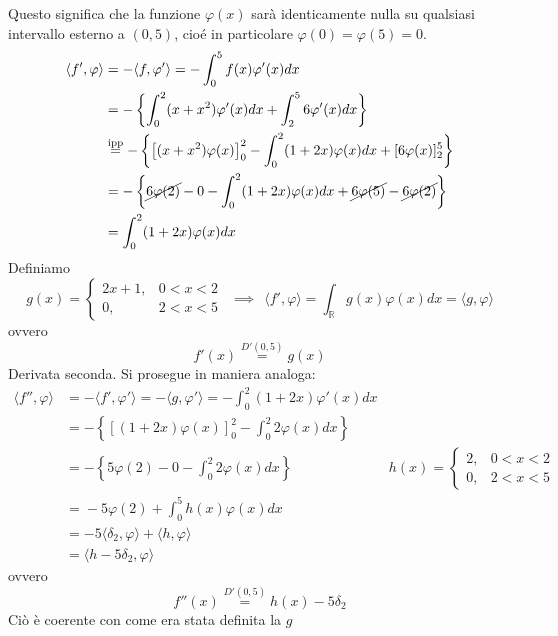 Questo significa che la funzione $\varphi (x)$ sarà identicamente nulla su qualsiasi intervallo esterno a $(0,5)$, cioé in particolare $\varphi ( 0) =\varphi ( 5) =0$.
\begin{align*}
\langle f',\varphi \rangle  & =-\langle f,\varphi '\rangle =-\int ^{5}_{0} f(x)\varphi '(x)dx\\
 & =-\left\{\int ^{2}_{0} (x+x^{2} )\varphi '(x)dx+\int ^{5}_{2} 6\varphi '(x)dx\right\}\\
 & \overset{\text{ipp}}{=} -\left\{\left[ (x+x^{2} )\varphi (x)\right]^{2}_{0} -\int ^{2}_{0} (1+2x)\varphi (x)dx+[ 6\varphi (x)]^{5}_{2}\right\}\\
 & =-\left\{\cancel{6\varphi ( 2)} -0-\int ^{2}_{0}( 1+2x) \varphi ( x) dx+\cancel{6\varphi ( 5)} -\cancel{6\varphi ( 2)}\right\}\\
 & =\int ^{2}_{0}( 1+2x) \varphi ( x) dx
\end{align*}
Definiamo
\begin{equation*}
g(x)=\begin{cases}
2x+1, & 0< x< 2\\
0, & 2< x< 5
\end{cases} \ \ \implies \ \ \langle f',\varphi \rangle =\int _{\mathbb{R}} g( x) \varphi ( x) dx=\langle g,\varphi \rangle 
\end{equation*}
ovvero
\begin{equation*}
f'(x)\overset{D'( 0,5)}{=} g(x)
\end{equation*}
Derivata seconda. Si prosegue in maniera analoga:
\begin{equation*}
\begin{aligned}
\langle f'',\varphi \rangle  & =-\langle f',\varphi '\rangle =-\langle g,\varphi '\rangle =-\int ^{2}_{0} (1+2x)\varphi '(x)dx & \\
 & =-\left\{[ (1+2x)\varphi (x)]^{2}_{0} -\int ^{2}_{0} 2\varphi (x)dx\right\} & \\
 & =-\left\{5\varphi (2)-0-\int ^{2}_{0} 2\varphi (x)dx\right\} & h(x)=\begin{cases}
2, & 0< x< 2\\
0, & 2< x< 5
\end{cases}\\
 & \overset{}{=} -5\varphi (2)+\int ^{5}_{0} h(x)\varphi (x)dx & \\
 & =-5\langle \delta _{2} ,\varphi \rangle +\langle h,\varphi \rangle  & \\
 & =\langle h-5\delta _{2} ,\varphi \rangle  & 
\end{aligned}
\end{equation*}
ovvero
\begin{equation*}
f''(x)\overset{D'( 0,5)}{=} h(x)-5\delta _{2}
\end{equation*}
Ciò è coerente con come era stata definita la $g$


